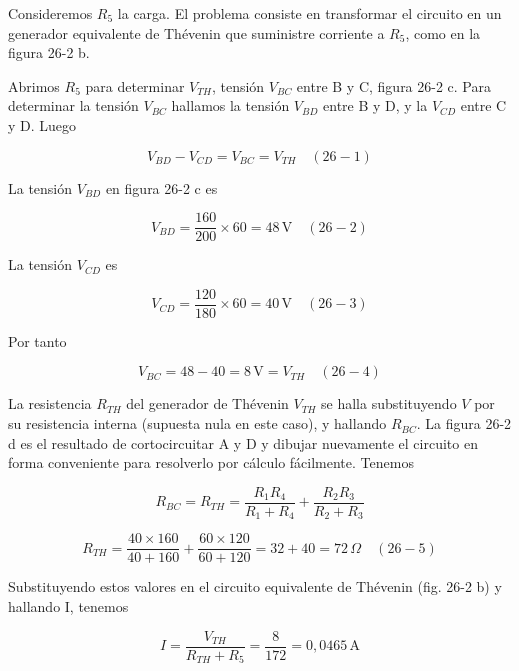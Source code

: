 \documentclass{article}
\begin{document}
Consideremos \( R_5 \) la carga. El problema consiste en transformar el circuito en un generador equivalente de Thévenin que suministre corriente a \( R_5 \), como en la figura 26-2 b.

Abrimos \( R_5 \) para determinar \( V_{TH} \), tensión \( V_{BC} \) entre B y C, figura 26-2 c. Para determinar la tensión \( V_{BC} \) hallamos la tensión \( V_{BD} \) entre B y D, y la \( V_{CD} \) entre C y D. Luego

\[
V_{BD} - V_{CD} = V_{BC} = V_{TH} \quad (26-1)
\]

La tensión \( V_{BD} \) en figura 26-2 c es

\[
V_{BD} = \frac{160}{200} \times 60 = 48 \, \text{V} \quad (26-2)
\]

La tensión \( V_{CD} \) es

\[
V_{CD} = \frac{120}{180} \times 60 = 40 \, \text{V} \quad (26-3)
\]

Por tanto

\[
V_{BC} = 48 - 40 = 8 \, \text{V} = V_{TH} \quad (26-4)
\]

La resistencia \( R_{TH} \) del generador de Thévenin \( V_{TH} \) se halla substituyendo \( V \) por su resistencia interna (supuesta nula en este caso), y hallando \( R_{BC} \). La figura 26-2 d es el resultado de cortocircuitar A y D y dibujar nuevamente el circuito en forma conveniente para resolverlo por cálculo fácilmente. Tenemos

\[
R_{BC} = R_{TH} = \frac{R_1 R_4}{R_1 + R_4} + \frac{R_2 R_3}{R_2 + R_3}
\]

\[
R_{TH} = \frac{40 \times 160}{40 + 160} + \frac{60 \times 120}{60 + 120} = 32 + 40 = 72 \, \Omega \quad (26-5)
\]

Substituyendo estos valores en el circuito equivalente de Thévenin (fig. 26-2 b) y hallando I, tenemos

\[
I = \frac{V_{TH}}{R_{TH} + R_5} = \frac{8}{172} = 0,0465 \, \text{A}
\]
\end{document}

